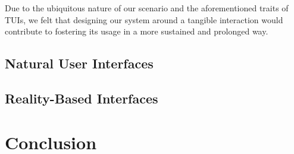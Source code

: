 Due to the ubiquitous nature of our scenario and the aforementioned traits of \acp{TUI}, we felt that designing our system around a tangible interaction would contribute to fostering its usage in a more sustained and prolonged way.

\subsection{Natural User Interfaces}

\subsection{Reality-Based Interfaces}

\section{Conclusion}